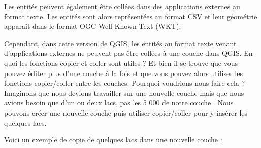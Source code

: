 Les entités peuvent également être collées dans des applications externes au format texte. Les entités sont alors représentées au format CSV et leur géométrie apparaît dans le format OGC Well-Known Text (WKT).

Cependant, dans cette version de QGIS, les entités au format texte venant d'applications externes ne peuvent pas être collées à une couche dans QGIS. En quoi les fonctions copier et coller sont utiles ? Et bien il se trouve que vous pouvez éditer plus d'une couche à la fois et que vous pouvez alors utiliser les fonctions copier/coller entre les couches. Pourquoi voudrions-nous faire cela ? Imaginons que nous devions travailler sur une nouvelle couche mais que nous avions besoin que d'un ou deux lacs, pas les 5 000 de notre couche . Nous pouvons créer une nouvelle couche puis utiliser copier/coller pour y insérer les quelques lacs.

Voici un exemple de copie de quelques lacs dans une nouvelle couche :

